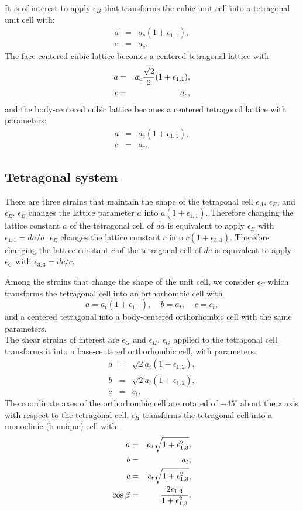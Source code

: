\documentclass[12pt,a4paper]{article}
\begin{document}
It is of interest to apply $\epsilon_B$ that transforms the 
cubic unit cell into a tetragonal unit cell with:
\begin{eqnarray}
a&=&a_c (1+\epsilon_{1,1}), \\
c&=&a_c.
\end{eqnarray}
The face-centered cubic lattice becomes a centered tetragonal lattice with
\begin{eqnarray}
a&=&a_c {\sqrt{2} \over 2} (1+\epsilon_{1,1}), \\
c&=&a_c,
\end{eqnarray}
and the body-centered cubic lattice becomes a centered tetragonal
lattice with parameters:
\begin{eqnarray}
a&=&a_c (1+\epsilon_{1,1}), \\
c&=&a_c.
\end{eqnarray}

\subsection{\color{web-blue}Tetragonal system}
There are three strains that maintain the shape of the tetragonal cell 
$\epsilon_A$, $\epsilon_B$, and $\epsilon_E$. $\epsilon_B$ changes the 
lattice parameter $a$ into $a(1+\epsilon_{1,1})$. 
Therefore changing the lattice constant $a$ of the tetragonal cell of $da$
is equivalent to apply $\epsilon_B$  with $\epsilon_{1,1}=da/a$.
$\epsilon_E$ changes the lattice constant $c$ into $c(1+\epsilon_{3,3})$. 
Therefore changing the lattice constant $c$ of the tetragonal cell of $dc$
is equivalent to apply $\epsilon_C$ with $\epsilon_{3,3}=dc/c$.

Among the strains that change the shape of the unit cell, we consider
$\epsilon_C$ which transforms the tetragonal cell into an  
orthorhombic cell with
\begin{equation}
a= a_t (1+\epsilon_{1,1}), \ \ \ \ \
b= a_t, \ \ \ \ \
c=c_t,
\end{equation}
and a centered tetragonal into a body-centered orthorhombic cell with the same
parameters.\\

The shear strains of interest are $\epsilon_G$ and $\epsilon_H$.
$\epsilon_G$ applied to the
tetragonal cell transforms it into a base-centered orthorhombic cell,
with parameters:
\begin{eqnarray}
a&=&\sqrt{2} a_t (1-\epsilon_{1,2}), \\
b&=&\sqrt{2} a_t (1+\epsilon_{1,2}) , \\
c&=&c_t.
\end{eqnarray}
The coordinate axes of the orthorhombic cell are rotated of $-45^\circ$ 
about the $z$ axis with respect to the tetragonal cell. $\epsilon_H$ 
transforms the tetragonal cell into a monoclinic (b-unique) cell with:
\begin{eqnarray}
a&=&a_t \sqrt{1+\epsilon_{1,3}^2}, \\
b&=&a_t, \\
c&=&c_t \sqrt{1+\epsilon_{1,3}^2}, \\
\cos\beta &=& {2 \epsilon_{1,3} \over 1 + \epsilon_{1,3}^2}.
\end{eqnarray}
\end{document}
